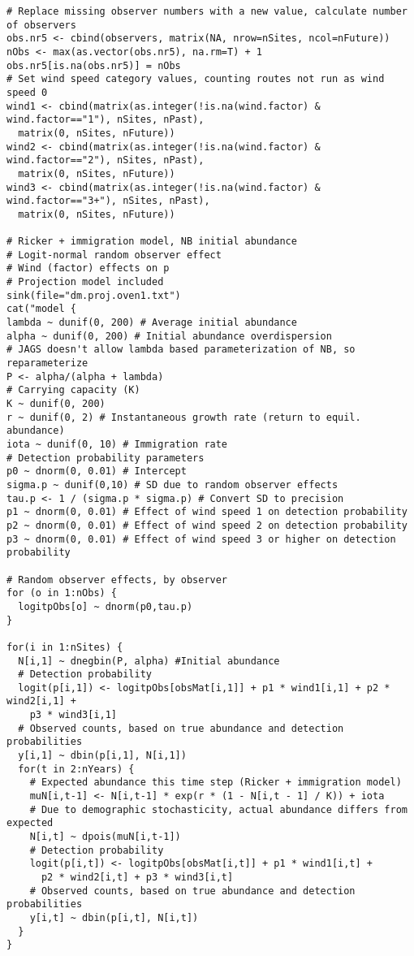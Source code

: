 \documentclass[12pt]{article}
\begin{document}
\begin{verbatim}
# Replace missing observer numbers with a new value, calculate number of observers
obs.nr5 <- cbind(observers, matrix(NA, nrow=nSites, ncol=nFuture))
nObs <- max(as.vector(obs.nr5), na.rm=T) + 1
obs.nr5[is.na(obs.nr5)] = nObs
# Set wind speed category values, counting routes not run as wind speed 0 
wind1 <- cbind(matrix(as.integer(!is.na(wind.factor) & wind.factor=="1"), nSites, nPast),
  matrix(0, nSites, nFuture))
wind2 <- cbind(matrix(as.integer(!is.na(wind.factor) & wind.factor=="2"), nSites, nPast),
  matrix(0, nSites, nFuture))
wind3 <- cbind(matrix(as.integer(!is.na(wind.factor) & wind.factor=="3+"), nSites, nPast),
  matrix(0, nSites, nFuture))

# Ricker + immigration model, NB initial abundance
# Logit-normal random observer effect
# Wind (factor) effects on p
# Projection model included
sink(file="dm.proj.oven1.txt")
cat("model {
lambda ~ dunif(0, 200) # Average initial abundance
alpha ~ dunif(0, 200) # Initial abundance overdispersion
# JAGS doesn't allow lambda based parameterization of NB, so reparameterize
P <- alpha/(alpha + lambda)
# Carrying capacity (K) 
K ~ dunif(0, 200)
r ~ dunif(0, 2) # Instantaneous growth rate (return to equil. abundance)
iota ~ dunif(0, 10) # Immigration rate
# Detection probability parameters
p0 ~ dnorm(0, 0.01) # Intercept
sigma.p ~ dunif(0,10) # SD due to random observer effects
tau.p <- 1 / (sigma.p * sigma.p) # Convert SD to precision
p1 ~ dnorm(0, 0.01) # Effect of wind speed 1 on detection probability
p2 ~ dnorm(0, 0.01) # Effect of wind speed 2 on detection probability
p3 ~ dnorm(0, 0.01) # Effect of wind speed 3 or higher on detection probability

# Random observer effects, by observer
for (o in 1:nObs) {
  logitpObs[o] ~ dnorm(p0,tau.p)
}

for(i in 1:nSites) {
  N[i,1] ~ dnegbin(P, alpha) #Initial abundance
  # Detection probability 
  logit(p[i,1]) <- logitpObs[obsMat[i,1]] + p1 * wind1[i,1] + p2 * wind2[i,1] + 
    p3 * wind3[i,1] 
  # Observed counts, based on true abundance and detection probabilities
  y[i,1] ~ dbin(p[i,1], N[i,1])
  for(t in 2:nYears) {
    # Expected abundance this time step (Ricker + immigration model)
    muN[i,t-1] <- N[i,t-1] * exp(r * (1 - N[i,t - 1] / K)) + iota
    # Due to demographic stochasticity, actual abundance differs from expected
    N[i,t] ~ dpois(muN[i,t-1])
    # Detection probability 
    logit(p[i,t]) <- logitpObs[obsMat[i,t]] + p1 * wind1[i,t] + 
      p2 * wind2[i,t] + p3 * wind3[i,t]
    # Observed counts, based on true abundance and detection probabilities 
    y[i,t] ~ dbin(p[i,t], N[i,t])
  }
}


\end{verbatim}
\end{document}

